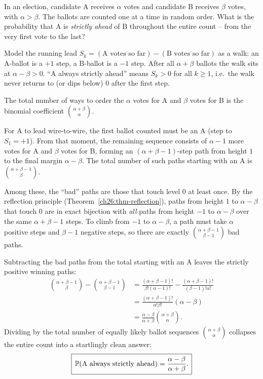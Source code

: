 \begin{example}
\label{ch26:ex-ballotworked}
In an election, candidate A receives $\alpha$ votes and candidate B receives
$\beta$ votes, with $\alpha > \beta$. The ballots are counted one at a time in
random order. What is the probability that A is \emph{strictly ahead} of B
throughout the entire count -- from the very first vote to the last?

Model the running lead $S_k = (\text{A votes so far}) - (\text{B votes so
far})$ as a walk: an A-ballot is a $+1$ step, a B-ballot is a $-1$ step. After
all $\alpha + \beta$ ballots the walk sits at $\alpha - \beta > 0$. ``A always
strictly ahead'' means $S_k > 0$ for all $k \ge 1$, i.e.\ the walk never
returns to (or dips below) $0$ after the first step.

The total number of ways to order the $\alpha$ votes for A and $\beta$ votes
for B is the binomial coefficient $\binom{\alpha+\beta}{\alpha}$.

For A to lead wire-to-wire, the first ballot counted must be an A (step to
$S_1 = +1$). From that moment, the remaining sequence consists of $\alpha - 1$
more votes for A and $\beta$ votes for B, forming an $(\alpha+\beta-1)$-step
path from height $1$ to the final margin $\alpha - \beta$. The total number of
such paths starting with an A is $\binom{\alpha+\beta-1}{\beta}$.

Among these, the ``bad'' paths are those that touch level $0$ at least once.
By the reflection principle (Theorem~\ref{ch26:thm-reflection}), paths from
height $1$ to $\alpha-\beta$ that touch $0$ are in exact bijection with
\emph{all} paths from height $-1$ to $\alpha-\beta$ over the same
$\alpha+\beta-1$ steps. To climb from $-1$ to $\alpha-\beta$, a path must take
$\alpha$ positive steps and $\beta-1$ negative steps, so there are exactly
$\binom{\alpha+\beta-1}{\beta-1}$ bad paths.

Subtracting the bad paths from the total starting with an A leaves the strictly
positive winning paths:
\begin{align*}
  \binom{\alpha+\beta-1}{\beta} - \binom{\alpha+\beta-1}{\beta-1}
  &= \frac{(\alpha+\beta-1)!}{\beta!(\alpha-1)!} - \frac{(\alpha+\beta-1)!}{(\beta-1)!\alpha!} \\
  &= \frac{(\alpha+\beta-1)!}{\alpha!\beta!}(\alpha - \beta) \\
  &= \frac{\alpha - \beta}{\alpha + \beta}\binom{\alpha+\beta}{\alpha}.
\end{align*}
Dividing by the total number of equally likely ballot sequences
$\binom{\alpha+\beta}{\alpha}$ collapses the entire count into a startlingly
clean answer:
\[
  \boxed{\,\P(\text{A always strictly ahead}) = \frac{\alpha - \beta}{\alpha + \beta}.\,}
\]


\end{example}
